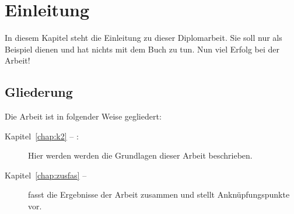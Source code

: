 \chapter{Einleitung}
In diesem Kapitel steht die Einleitung zu dieser Diplomarbeit. Sie soll nur als Beispiel dienen und hat nichts mit dem Buch \cite{WSPA} zu tun. Nun viel Erfolg bei der Arbeit!

\section*{Gliederung}
Die Arbeit ist in folgender Weise gegliedert:
\begin{description}
\item[Kapitel~\ref{chap:k2} -- :] Hier werden werden die Grundlagen dieser Arbeit beschrieben.
\item[Kapitel~\ref{chap:zusfas} -- ] fasst die Ergebnisse der Arbeit zusammen und stellt Anknüpfungspunkte vor.
\end{description}

